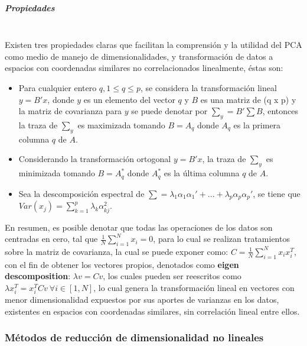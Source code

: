 \subparagraph{Propiedades\\\\}

Existen tres propiedades claras que facilitan la comprensión y la utilidad del PCA como medio de manejo de dimensionalidades, y transformación de datos a espacios con coordenadas similares no correlacionados linealmente, éstas son:

\begin{itemize}
	
	\item Para cualquier entero $ q, 1\leq q \leq p $, se considera la transformación lineal $y = B'x$, donde $y$ es un elemento del vector $q$ y $B$ es una matriz de (q x p) y la matriz de covarianza para $y$ se puede denotar por $\sum_{y} = B'\sum B$, entonces la traza de $\sum_{y}$ es maximizada tomando $B=A_{q}$ donde $A_{q}$ es la primera columna $ q $ de $ A $.
	
	\item Considerando la transformación ortogonal $y=B'x$, la traza de $\sum_{y}$ es minimizada tomando $B=A_{q}^{*}$ donde $A_{q}^{*}$ es la última columna $ q $ de $ A $.
	
	\item Sea la descomposición espectral de $\sum = \lambda_{1}\alpha_{1}\alpha_{1}'+...+\lambda_{p}\alpha_{p}\alpha_{p}'$, se tiene que $Var(x_{j}) = \sum_{k=1}^{p}\lambda_{k}\alpha^{2}_{kj}$. 
\end{itemize}

En resumen, es posible denotar que todas las operaciones de los datos son centradas en cero, tal que $ \frac{1}{N} \sum_{i=1}^{N}x_{i}=0$, para lo cual se realizan tratamientos sobre la matriz de covarianza, la cual se puede exponer como: $C = \frac{1}{N}\sum_{i=1}^{N}x_{i}x_{i}^{T}$, con el fin de obtener los vectores propios, denotados como \textbf{eigen descomposition}: $\lambda v = Cv$, los cuales pueden ser reescritos como $\lambda x^{T}_{i} = x_{i}^{T}Cv\ \forall i \in [1,N]$, lo cual genera la transformación lineal en vectores con menor dimensionalidad expuestos por sus aportes de varianzas en los datos, existentes en espacios con coordenadas similares, sin correlación lineal entre ellos.



\subsubsection{Métodos de reducción de dimensionalidad no lineales}

